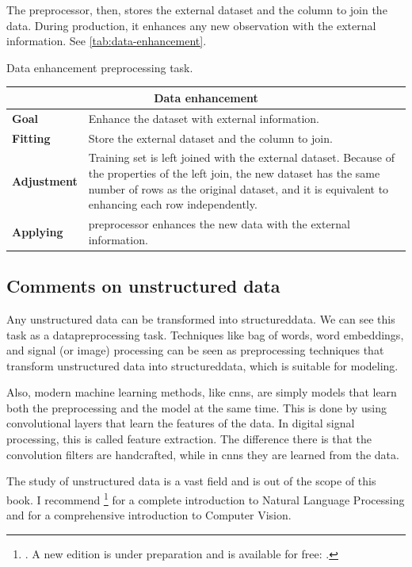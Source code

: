 The \gls{preprocessor}, then, stores the external dataset and the column to join the data.
During production, it enhances any new observation with the external information.  See
\cref{tab:data-enhancement}.

\begin{tablebox}[label=tab:data-enhancement]{Data enhancement preprocessing task.}
  \centering
  \begin{tabular}{lp{6cm}}
    \toprule
    \multicolumn{2}{c}{\textbf{Data enhancement}} \\
    \midrule
    \textbf{Goal} &
      Enhance the dataset with external information. \\
    \textbf{Fitting} &
      Store the external dataset and the column to join. \\
    \textbf{Adjustment} &
      Training set is left joined with the external dataset.  Because of the properties of
      the left join, the new dataset has the same number of rows as the original dataset,
      and it is equivalent to enhancing each row independently.  \\
    \textbf{Applying} &
      \Gls{preprocessor} enhances the new data with the external information. \\
    \bottomrule
  \end{tabular}
\end{tablebox}

\subsection{Comments on unstructured data}

Any unstructured data can be transformed into \gls{structureddata}.  We can see this task as a
\gls{datapreprocessing} task.  Techniques like bag of words, word embeddings, and signal (or
image) processing can be seen as preprocessing techniques that transform unstructured data
into \gls{structureddata}, which is suitable for modeling.

Also, modern machine learning methods, like \glspl{cnn}, are simply models that learn both
the preprocessing and the model at the same time.  This is done by using convolutional
layers that learn the features of the data.  In digital signal processing, this is called
feature extraction.  The difference there is that the convolution filters are handcrafted,
while in \glspl{cnn} they are learned from the data.

The study of unstructured data is a vast field and is out of the scope of this book.  I
recommend \textcite{Jurafsky2008}\footnote{. A new edition is
under preparation and is available for free: .} for a complete
introduction to Natural Language Processing and
\textcite{Szeliski2022} for a comprehensive introduction to
Computer Vision.

